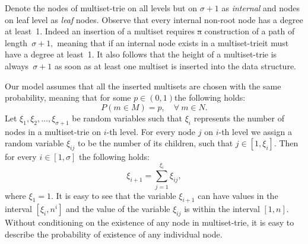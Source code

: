 \documentclass[10pt,letterpaper]{article}
\providecommand{\DIFaddtex}[1]{{\protect\color{blue}\uwave{#1}}} %
\providecommand{\DIFdeltex}[1]{{\protect\color{red}\sout{#1}}}                      %
\providecommand{\DIFaddbegin}{} %
\providecommand{\DIFaddend}{} %
\providecommand{\DIFdelbegin}{} %
\providecommand{\DIFdelend}{} %
\providecommand{\DIFadd}[1]{\texorpdfstring{\DIFaddtex{#1}}{#1}} %
\providecommand{\DIFdel}[1]{\texorpdfstring{\DIFdeltex{#1}}{}} %
\newcommand{\DIFscaledelfig}{0.5}
\newlength{\DIFdelgraphicswidth} %
\newlength{\DIFdelgraphicsheight} %
\newcommand{\DIFaddincludegraphics}[2][]{{\color{blue}\fbox{\DIFOincludegraphics[#1]{#2}}}} %
\newcommand{\DIFdelincludegraphics}[2][]{%
\sbox{\DIFdelgraphicsbox}{\DIFOincludegraphics[#1]{#2}}%
\settoboxwidth{\DIFdelgraphicswidth}{\DIFdelgraphicsbox} %
\settoboxtotalheight{\DIFdelgraphicsheight}{\DIFdelgraphicsbox} %
\scalebox{\DIFscaledelfig}{%
\parbox[b]{\DIFdelgraphicswidth}{\usebox{\DIFdelgraphicsbox}\\[-\baselineskip] \rule{\DIFdelgraphicswidth}{0em}}\llap{\resizebox{\DIFdelgraphicswidth}{\DIFdelgraphicsheight}{%
\setlength{\unitlength}{\DIFdelgraphicswidth}%
\begin{picture}(1,1)%
\thicklines\linethickness{2pt} %
{\color[rgb]{1,0,0}\put(0,0){\framebox(1,1){}}}%
{\color[rgb]{1,0,0}\put(0,0){\line( 1,1){1}}}%
{\color[rgb]{1,0,0}\put(0,1){\line(1,-1){1}}}%
\end{picture}%
}\hspace*{3pt}}} %
} %
\DeclareRobustCommand{\DIFaddbegin}{\DIFOaddbegin \let\includegraphics\DIFaddincludegraphics} %
\DeclareRobustCommand{\DIFaddend}{\DIFOaddend \let\includegraphics\DIFOincludegraphics} %
\DeclareRobustCommand{\DIFdelbegin}{\DIFOdelbegin \let\includegraphics\DIFdelincludegraphics} %
\DeclareRobustCommand{\DIFdelend}{\DIFOaddend \let\includegraphics\DIFOincludegraphics} %
\begin{document}
Denote the nodes of multiset-trie on all levels but on $\sigma + 1$ as \emph{internal}
and nodes on leaf level as \emph{leaf} nodes.
%
Observe that every internal non-root node has a degree at least~1. Indeed an
insertion of a multiset requires \DIFdelbegin \DIFdel{a }\DIFdelend construction of a path of length~$\sigma + 1,$
meaning that if an internal node exists in a multiset-trie\DIFaddbegin \DIFadd{, }\DIFaddend it must have a degree
at least~1. It also follows that the height of a multiset-trie is always~$\sigma +1$
as soon as at least one multiset is inserted into the data structure.

Our model assumes that all the inserted multisets are chosen with the same probability,
meaning that for some $p\in (0,1)$\DIFaddbegin \DIFadd{, }\DIFaddend the following holds:
\[
P(m\in M) = p, \quad \forall~m\in N.
\]
%
Let $\xi_1, \xi_2, \ldots, \xi_{\sigma+1}$ be random variables such that $\xi_i$
represents the number of nodes in a multiset-trie on $i$-th level. For every node $j$ 
on $i$-th level we assign a random variable $\xi_{ij}$ to be the number of its children, 
such that $j\in[1,\xi_i].$ Then for every $i\in[1,\sigma]$ the following holds:
%
\begin{equation}\label{eq:sum_recursive}
\xi_{i+1} = \sum_{j=1}^{\xi_i} \xi_{ij},
\end{equation}
%
where $\xi_1 = 1.$
%
It is easy to see that the variable $\xi_{i+1}$ can have values in the interval
$[\xi_i,n^{i}]$ and the value of the variable $\xi_{ij}$ is within the interval $[1,n].$
Without conditioning on the existence of any node in multiset-trie, 
it is easy to describe the probability of \DIFaddbegin \DIFadd{the }\DIFaddend existence of any individual node.
\end{document}
